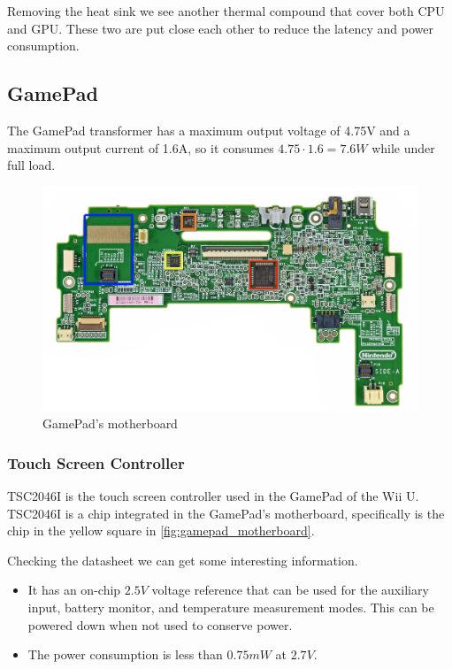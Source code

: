 \documentclass[11pt,a4paper,titlepage]{article}
\begin{document}
		Removing the heat sink we see another thermal compound that cover both CPU and GPU. These two are put close each other to reduce the latency and power consumption.

	\subsection{GamePad}
		The GamePad transformer has a maximum output voltage of 4.75V and a maximum output current of 1.6A, so it consumes $4.75\cdot 1.6 = 7.6W$ while under full load.
		\begin{figure}[htbp]
			\includegraphics[width=\textwidth]{gamepad_motherboard_front.png}
			\caption{GamePad's motherboard}
			\label{fig:gamepad_motherboard}
		\end{figure}
		\subsubsection{Touch Screen Controller}
			TSC2046I is the touch screen controller used in the GamePad of the Wii U. TSC2046I is a chip integrated in the GamePad's motherboard, specifically is the chip in the yellow square in \autoref{fig:gamepad_motherboard}.

			Checking the datasheet \cite{touchscreen} we can get some interesting information.
			\begin{itemize}
				\item It has an on-chip $2.5V$ voltage reference that can be used for the auxiliary input, battery monitor, and temperature measurement modes. This can be powered down when not used to conserve power.
				\item The power consumption is less than $0.75mW$ at $2.7V$.
			\end{itemize}
\end{document}
